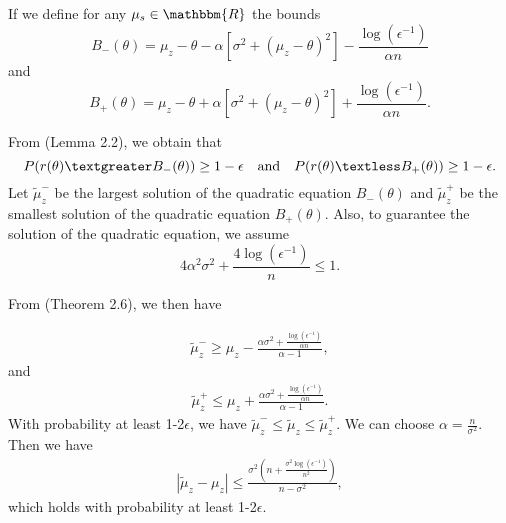 \documentclass[11pt]{article}
\begin{document}
If we define for any $\mu_s\in\mathbbm{R}$ the bounds
\begin{equation}
    B_{-}(\theta)=\mu_z-\theta-\alpha[\sigma^2+(\mu_z-\theta)^2]-\frac{\log(\epsilon^{-1})}{\alpha n}
\end{equation}
and 
\begin{equation}
    B_{+}(\theta)=\mu_z-\theta+\alpha[\sigma^2+(\mu_z-\theta)^2]+\frac{\log(\epsilon^{-1})}{\alpha n}.
\end{equation}

From \cite{chen2020generalized} (Lemma 2.2), we obtain that 
\begin{equation}
    P(r(\theta)\textgreater B_{-}(\theta))\geq 1-\epsilon\quad \text{and} \quad P(r(\theta)\textless B_{+}(\theta))\geq 1-\epsilon.
\end{equation}
Let $\tilde{\mu}^{-}_z$ be the largest solution of the quadratic equation $B_{-}(\theta)$ and $\tilde{\mu}^{+}_z$ be the smallest solution of the quadratic equation $B_{+}(\theta)$. Also, to guarantee the solution of the quadratic equation, we assume 
\begin{equation}
    4\alpha^2\sigma^2+\frac{4\log(\epsilon^{-1})}{n}\leq1.
\end{equation}

From \cite{chen2020generalized} (Theorem 2.6), we then have 

\begin{equation}
\begin{aligned}
   \tilde{\mu}^{-}_z\geq \mu_z-\frac{\alpha\sigma^2+\frac{\log(\epsilon^{-1})}{\alpha n}}{\alpha-1},
\end{aligned}
\end{equation}
and 
\begin{equation}
\begin{aligned}
   \tilde{\mu}^{+}_z\leq \mu_z+\frac{\alpha\sigma^2+\frac{\log(\epsilon^{-1})}{\alpha n}}{\alpha-1}.
\end{aligned}
\end{equation}
With probability at least 1-2$\epsilon$, we have $\tilde{\mu}^{-}_z\leq\tilde{\mu}_z\leq\tilde{\mu}^{+}_z$. We can
choose $\alpha=\frac{n}{\sigma^2}$. Then we have 
\begin{equation}
\begin{aligned}
   |\tilde{\mu}_z-\mu_z|\leq\frac{\sigma^2(n+\frac{\sigma^2\log(\epsilon^{-1})}{n^2})}{n-\sigma^2},
\end{aligned}
\end{equation}
which holds with probability at least 1-2$\epsilon$. 
\end{document}
